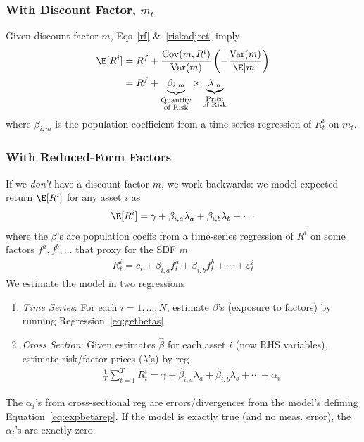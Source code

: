 \documentclass[12pt]{article}
\theoremstyle{plain}
\theoremstyle{definition}
\theoremstyle{remark}
\newcommand{\Cov}{\operatorname{Cov}}
\newcommand{\Var}{\operatorname{Var}}
\newcommand{\sumtT}{\sum^T_{t=1}}
\begin{document}
\begin{multicols*}{2}
\subsubsection{With Discount Factor, $m_t$}

Given discount factor $m$, Eqs~\ref{rf} \&~\ref{riskadjret} imply
\begin{align}
  \E[R^i]
  &=
  R^f +
  \frac{\Cov(m,R^i)}{\Var(m)}
  \left(
  -\frac{\Var(m)}{\E[m]}
  \right)
  \notag
  \\
  &=
  R^f +
  \underbrace{\beta_{i,m}}_{\substack{\text{Quantity}\\\text{of Risk}}}
  \times
  \underbrace{\lambda_m}_{\substack{\text{Price}\\\text{of Risk}}}
  \label{eq:betarep}
\end{align}
where $\beta_{i,m}$ is the population coefficient from a time series
regression of $R^i_t$ on $m_t$.

\subsubsection{With Reduced-Form Factors}

If we \emph{don't} have a discount factor $m$, we work backwards: we
model expected return $\E[R^i]$ for any asset $i$ as
\begin{align}
  \E[R^i]
  = \gamma + \beta_{i,a}\lambda_a + \beta_{i,b} \lambda_b + \cdots
  \label{eq:expbetarep}
\end{align}
where the $\beta$'s are population coeffs from a time-series regression
of $R^i$ on some factors $f^a, f^b,\ldots$ that proxy for the SDF $m$
\begin{align}
  R_t^i = c_i + \beta_{i,a} f_t^a + \beta_{i,b} f_t^b + \cdots
  + \varepsilon^i_t
  \label{eq:getbetas}
\end{align}
We estimate the model in two regressions
\begin{enumerate}[label=(\roman*)]
  \item
    \emph{Time Series}:
    For each $i=1,\ldots,N$, estimate $\beta$'s (exposure to factors) by
    running Regression~\ref{eq:getbetas}
  \item
    \emph{Cross Section}:
    Given estimates $\hat{\beta}$ for each asset $i$ (now RHS
    variables), estimate risk/factor prices ($\lambda$'s)
    by reg
    \begin{align*}
      \frac{1}{T}\sumtT
      R^i_t
      = \gamma + \hat{\beta}_{i,a}\lambda_a + \hat{\beta}_{i,b}
      \lambda_b + \cdots
      + \alpha_i
    \end{align*}
\end{enumerate}
The $\alpha_i$'s from cross-sectional reg are errors/divergences
from the model's defining Equation~\ref{eq:expbetarep}. If the model is
exactly true (and no meas. error), the $\alpha_i$'s are exactly
zero.
\columnbreak


\end{multicols*}
\end{document}
